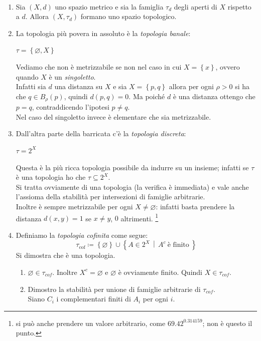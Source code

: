 \begin{example}\
\begin{enumerate}
	\item Sia $(X,d)$ uno spazio metrico e sia la famiglia $\tau_d$ degli aperti di $X$ rispetto a $d$. Allora $(X,\tau_d)$ formano uno spazio topologico. 
	\item La topologia più povera in assoluto è la \textit{topologia banale}: 
	\begin{center}
		$\tau = \left\{\varnothing, X\right\}$ 
	\end{center}
	Vediamo che non è metrizzabile se non nel caso in cui $X = \left\{x\right\}$, ovvero quando $X$ è un \textit{singoletto}. \\ Infatti sia $d$ una distanza su $X$ e sia $X = \left\{p,q\right\}$ allora per ogni $\rho > 0$ si ha che $q \in B_\rho(p)$, quindi $d(p,q) = 0$. Ma poiché $d$ è una distanza ottengo che $p=q$, contraddicendo l'ipotesi $p \neq q$. \\ Nel caso del singoletto invece è elementare che sia metrizzabile.
	\item Dall'altra parte della barricata c'è la \textit{topologia discreta}: 
	\begin{center}
		$\tau = 2^X$
	\end{center}
	Questa è la più ricca topologia possibile da indurre su un insieme; infatti se $\tau$ è una topologia ho che $\tau \subseteq 2^X$. \\ Si tratta ovviamente di una topologia (la verifica è immediata) e vale anche l'assioma della stabilità per intersezioni di famiglie arbitrarie. \\ Inoltre è sempre metrizzabile per ogni $X \neq \varnothing$: infatti basta prendere la distanza $d(x,y) = 1$ se $x \neq y$, $0$ altrimenti. \footnote{si può anche prendere un valore arbitrario, come $69.42^{0.314159}$; non è questo il punto.}
	\item Definiamo la \textit{topologia cofinita} come segue:
	\begin{equation*}
		\tau_{\text{cof}} \coloneqq \left\{\varnothing\right\} \cup \left\{ A \in 2^X  \,\middle|\, A^c\ \text{è finito}\ \right\}
	\end{equation*}
	Si dimostra che è una topologia.
	\begin{enumerate}
		\item $\varnothing \in \tau_{cof}$. Inoltre $X^c = \varnothing$ e $\varnothing$ è ovviamente finito. Quindi $X \in \tau_{cof}$.
		\item Dimostro la stabilità per unione di famiglie arbitrarie di $\tau_{cof}$. \\ Siano $C_i$ i complementari finiti di $A_i$ per ogni $i$.

\end{enumerate}
\end{enumerate}
\end{example}

